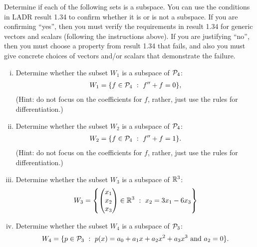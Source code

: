 \begin{question}
    \normalfont
    Determine if each of the following sets is a subspace.  You can use the conditions in LADR result 1.34 to confirm whether it is or is not a subspace.  If you are confirming ``yes'', then you must verify the requirements in result 1.34 for generic vectors and scalars (following the instructions above).  If you are justifying ``no'', then you must choose a property from result 1.34 that fails, and also you must give concrete choices of vectors and/or scalars that demonstrate the failure.

    \begin{enumerate}[(i)]
        \item Determine whether the subset $W_1$ is a subspace of $\P_4$:
        \begin{align*}
            W_1=\{ f\in \P_4\ : \ f''+f=0 \},
        \end{align*}
        (Hint: do not focus on the coefficients for $f$, rather, just use the rules for differentiation.)

        \vspace{.6cm}

        \item Determine whether the subset $W_2$  is a subspace of $\P_4$:
        \begin{align*}
            W_2=\{ f\in \P_4\ : \ f''+f=1 \}.
        \end{align*}
        (Hint: do not focus on the coefficients for $f$, rather, just use the rules for differentiation.)

        \vspace{.6cm}

        \item  Determine whether the subset $W_3$ is a subspace of $\real^3$:
        \begin{align*}
            W_3 = \left\{ \colvecthree{x_1}{x_2}{x_3}\in \real^3 \ :\ x_2 = 3x_1 - 6x_3  \right\}
        \end{align*}

        \vspace{.6cm}

        \item Determine whether the subset $W_4$  is a subspace of $\P_3$:
        \begin{align*}
            W_4 = \{ p\in\P_3\ : \ p(x) = a_0 + a_1x + a_2 x^2 + a_3x^3\ \text{and}\ a_2=0 \}.
        \end{align*}


\end{enumerate}
\end{question}
